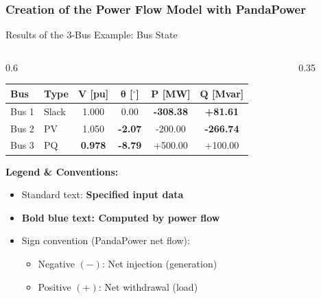 \begin{frame}
    \frametitle{Creation of the Power Flow Model with PandaPower}
    
\end{frame}

\begin{frame}{Results of the 3-Bus Example: Bus State}

    

    \begin{columns}
        \begin{column}{0.6\textwidth}
                \begin{table}[h]
        \centering
        \footnotesize
        \setlength{\tabcolsep}{6pt}
        \begin{tabular}{llcccc}
            \toprule
            \textbf{Bus} & \textbf{Type} & $\mathbf{V}$ \textbf{[pu]} & $\boldsymbol{\theta}$ \textbf{[$^\circ$]} & $\mathbf{P}$ \textbf{[MW]} & $\mathbf{Q}$ \textbf{[Mvar]} \\
            \midrule
            Bus 1 & Slack & 1.000 & 0.00 & \color{blue}\textbf{-308.38} & \color{blue}\textbf{+81.61} \\
            Bus 2 & PV    & 1.050 & \color{blue}\textbf{-2.07} & -200.00 & \color{blue}\textbf{-266.74} \\
            Bus 3 & PQ    & \color{blue}\textbf{0.978} & \color{blue}\textbf{-8.79} & +500.00 & +100.00 \\
            \bottomrule
        \end{tabular}
    \end{table}
            \textbf{Legend \& Conventions:}
            \begin{itemize}
                \item Standard text: \textbf{Specified input data}
                \item \color{blue}\textbf{Bold blue text: Computed by power flow}
                \item Sign convention (PandaPower net flow):
                \begin{itemize}
                    \item Negative $(-)$: Net injection (generation)
                    \item Positive $(+)$: Net withdrawal (load)
                \end{itemize}
            \end{itemize}
        \end{column}
        \begin{column}{0.35\textwidth}

\end{column}
\end{columns}
\end{frame}
